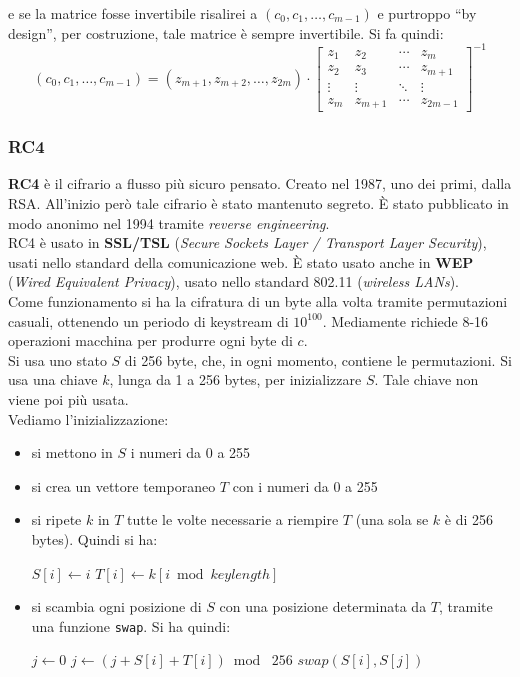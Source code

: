 \documentclass[a4paper,12pt, oneside]{book}
\begin{document}
e se la matrice fosse invertibile risalirei a $(c_0,c_1,\ldots,c_{m-1})$ e
purtroppo ``by design'', per costruzione, tale matrice è sempre invertibile. Si
fa quindi:
\[(c_0,c_1,\ldots,c_{m-1})=(z_{m+1},z_{m+2},\ldots, z_{2m})\cdot
  \left[
    \begin{matrix}
      z_1 & z_2 &\cdots &z_m\\
      z_2 & z_3 &\cdots &z_{m+1}\\
      \vdots & \vdots &\ddots &\vdots\\
      z_m & z_{m+1} &\cdots &z_{2m-1}
    \end{matrix}
  \right]^{-1}
\]
\subsubsection{RC4}
\textbf{RC4} è il cifrario a flusso più sicuro pensato. Creato nel 1987, uno dei
primi, dalla RSA. All'inizio però tale cifrario è stato mantenuto segreto. È
stato pubblicato in modo anonimo nel 1994 tramite \textit{reverse
  engineering}.\\
RC4 è usato in \textbf{SSL/TSL} (\textit{Secure Sockets Layer / Transport Layer
  Security}), usati nello standard della comunicazione web. È stato usato anche
in \textbf{WEP} (\textit{Wired Equivalent Privacy}), usato nello standard 802.11
(\textit{wireless LANs}).\\
Come funzionamento si ha la cifratura di un byte alla volta tramite permutazioni
casuali, ottenendo un periodo di keystream di $10^{100}$. Mediamente richiede
8-16 operazioni macchina per produrre ogni byte di $c$.\\
Si usa uno stato $S$ di 256 byte, che, in ogni momento, contiene le
permutazioni. Si usa una chiave $k$, lunga da 1 a 256 bytes, per inizializzare
$S$. Tale chiave non viene poi più usata.\\
Vediamo l'inizializzazione:
\begin{itemize}
  \item si mettono in $S$ i numeri da 0 a 255
  \item si crea un vettore temporaneo $T$ con i numeri da 0 a 255
  \item si ripete $k$ in $T$ tutte le volte necessarie a riempire $T$ (una sola
  se $k$ è di 256 bytes). Quindi si ha:
  \begin{algorithmic}
    \State $S[i]\gets i$
    \State $T[i]\gets k[i\bmod keylength]$
    \EndFor
  \end{algorithmic}
  \item si scambia ogni posizione di $S$ con una posizione determinata da $T$,
  tramite una funzione \texttt{swap}. Si ha quindi:
  \begin{algorithmic}
    \State $j\gets 0$
    \State $j\gets (j+S[i]+T[i])\bmod\,\,256$
    \State $swap(S[i],S[j])$
    \EndFor
  \end{algorithmic}
\end{itemize}
\end{document}
